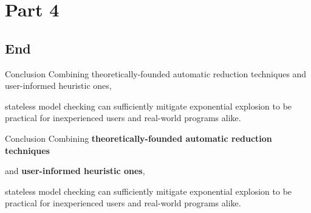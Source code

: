 \documentclass[xcolor=dvipsnames]{beamer}
\newcommand\hilight[2]{\color{#1}#2\color{black}}
\begin{document}

\section{Part 4}
\subsection{End}


\begin{frame}{Conclusion}
	Combining %
	theoretically-founded automatic reduction techniques
	and user-informed heuristic ones,
	\linegap

	stateless model checking
	\hilight{sect-quicksand}{can sufficiently mitigate exponential explosion}\xspace
	\hilight{sect-410}{to be practical for inexperienced users}\xspace
	\hilight{sect-htm}{and real-world programs alike.}\xspace
\end{frame}
\begin{frame}{Conclusion}
	Combining %
	{\bf theoretically-founded automatic reduction techniques}
	\vspace{4.82em}

	and {\bf user-informed heuristic ones},
	\vspace{4.82em}
	\linegap

	\hilight{gray}{stateless model checking}\xspace
	\hilight{sect-pastel-quicksand}{can sufficiently mitigate exponential explosion}\xspace
	\hilight{sect-pastel-410}{to be practical for inexperienced users}\xspace
	\hilight{sect-pastel-htm}{and real-world programs alike.}\xspace
\end{frame}
\end{document}
